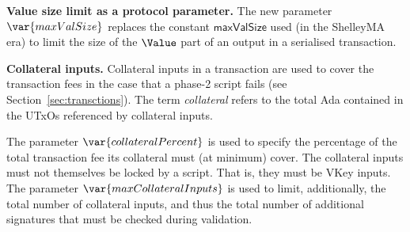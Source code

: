 \textbf{Value size limit as a protocol parameter.}
The new parameter $\var{maxValSize}$ replaces the constant $\mathsf{maxValSize}$
used (in the ShelleyMA era) to limit the size of the $\Value$ part of an output in a
serialised transaction.

\textbf{Collateral inputs.}
Collateral inputs in a transaction are used to cover the transaction fees in the case
that a phase-2 script fails (see Section~\ref{sec:transctions}).
The term \emph{collateral} refers to the total Ada contained in the UTxOs referenced
by collateral inputs.

The parameter $\var{collateralPercent}$ is used to specify the percentage of
the total transaction fee its collateral must (at minimum) cover. The
collateral inputs must not themselves be locked by a script. That is, they must
be VKey inputs. The parameter $\var{maxCollateralInputs}$ is used to limit, additionally,
the total number of collateral inputs, and thus the total number of additional
signatures that must be checked during validation.


